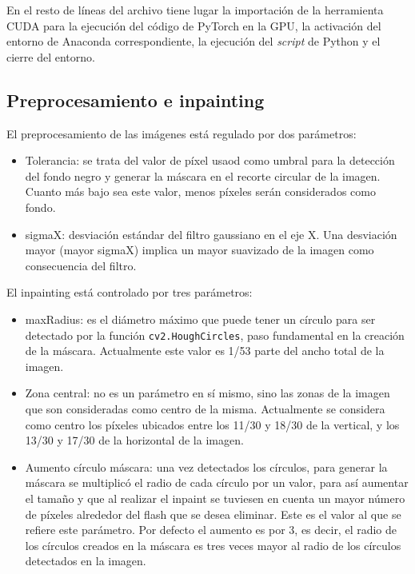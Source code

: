 En el resto de líneas del archivo tiene lugar la importación de la herramienta CUDA para la ejecución del código de PyTorch en la GPU, la activación del entorno de Anaconda correspondiente, la ejecución del \textit{script} de Python y el cierre del entorno.

\subsection{Preprocesamiento e inpainting}

El preprocesamiento de las imágenes está regulado por dos parámetros:
\begin{itemize}
    \item Tolerancia: se trata del valor de píxel usaod como umbral para la detección del fondo negro y generar la máscara en el recorte circular de la imagen. Cuanto más bajo sea este valor, menos píxeles serán considerados como fondo.
    \item sigmaX: desviación estándar del filtro gaussiano en el eje X. Una desviación mayor (mayor sigmaX) implica un mayor suavizado de la imagen como consecuencia del filtro.
\end{itemize}

El inpainting está controlado por tres parámetros:
\begin{itemize}
    \item maxRadius: es el diámetro máximo que puede tener un círculo para ser detectado por la función \texttt{cv2.HoughCircles}, paso fundamental en la creación de la máscara. Actualmente este valor es 1/53 parte del ancho total de la imagen.
    \item Zona central: no es un parámetro en sí mismo, sino las zonas de la imagen que son consideradas como centro de la misma. Actualmente se considera como centro los píxeles ubicados entre los 11/30 y 18/30 de la vertical, y los 13/30 y 17/30 de la horizontal de la imagen.
    \item Aumento círculo máscara: una vez detectados los círculos, para generar la máscara se multiplicó el radio de cada círculo por un valor, para así aumentar el tamaño y que al realizar el inpaint se tuviesen en cuenta un mayor número de píxeles alrededor del flash que se desea eliminar. Este es el valor al que se refiere este parámetro. Por defecto el aumento es por 3, es decir, el radio de los círculos creados en la máscara es tres veces mayor al radio de los círculos detectados en la imagen.
\end{itemize}



